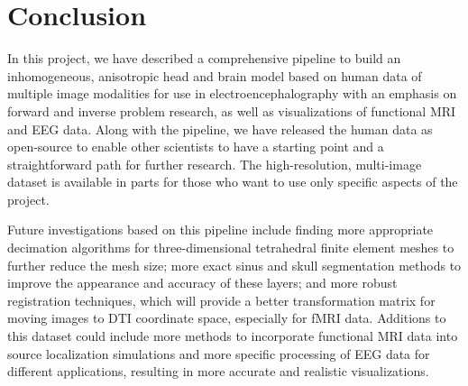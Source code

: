 %
%

\section{Conclusion}
\label{sec:Conclusion}


In this project, we have described a comprehensive pipeline to build an inhomogeneous, anisotropic head and brain model based on human data of multiple image modalities for use in electroencephalography with an emphasis on forward and inverse problem research, as well as visualizations of functional MRI and EEG data. Along with the pipeline, we have released the human data as open-source to enable other scientists to have a starting point and a straightforward path for further research. The high-resolution, multi-image dataset is available in parts for those who want to use only specific aspects of the project.

Future investigations based on this pipeline include finding more appropriate decimation algorithms for three-dimensional tetrahedral finite element meshes to further reduce the mesh size; more exact sinus and skull segmentation methods to improve the appearance and accuracy of these layers; and more robust registration techniques, which will provide a better transformation matrix for moving images to DTI coordinate space, especially for fMRI data. Additions to this dataset could include more methods to incorporate functional MRI data into source localization simulations and more specific processing of EEG data for different applications, resulting in more accurate and realistic visualizations. 
